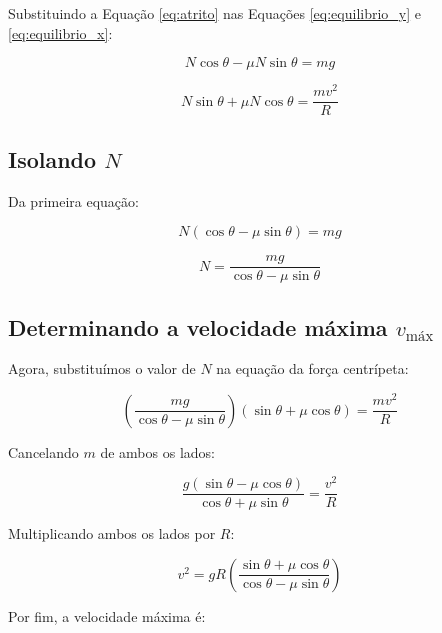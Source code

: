 \documentclass[a4paper,12pt]{article}
\begin{document}
\begin{flushleft}
Substituindo a Equação \eqref{eq:atrito} nas Equações \eqref{eq:equilibrio_y} e \eqref{eq:equilibrio_x}:

\begin{equation}
N \cos\theta - \mu N \sin\theta = mg
\end{equation}

\begin{equation}
N \sin\theta + \mu N \cos\theta = \frac{mv^2}{R}
\end{equation}

\subsection*{Isolando \( N \)}

Da primeira equação:

\begin{equation}
N \left( \cos\theta - \mu \sin\theta \right) = mg
\end{equation}

\begin{equation}
N = \frac{mg}{\cos\theta - \mu \sin\theta}
\label{eq:N}
\end{equation}

\subsection*{Determinando a velocidade máxima \( v_{\text{máx}} \)}

Agora, substituímos o valor de \( N \) na equação da força centrípeta:

\begin{equation}
\left( \frac{mg}{\cos\theta - \mu \sin\theta} \right) \left( \sin\theta + \mu \cos\theta \right) = \frac{mv^2}{R}
\end{equation}

Cancelando \( m \) de ambos os lados:

\begin{equation}
\frac{g \left( \sin\theta - \mu \cos\theta \right)}{\cos\theta + \mu \sin\theta} = \frac{v^2}{R}
\end{equation}

Multiplicando ambos os lados por \( R \):

\begin{equation}
v^2 = gR \left( \frac{ \sin\theta + \mu \cos\theta }{ \cos\theta - \mu \sin\theta } \right)
\end{equation}

Por fim, a velocidade máxima é:


\end{flushleft}
\end{document}
